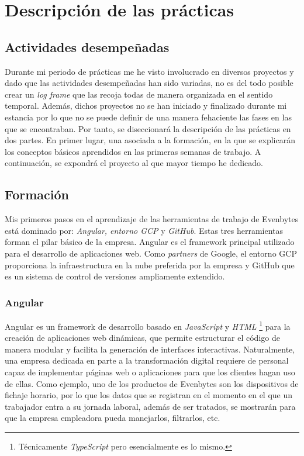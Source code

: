 \chapter{Descripción de las prácticas} \label{descripcion de las practicas}
%
%
\section{Actividades desempeñadas} \label{Actividades desempeñadas}
%
Durante mi periodo de prácticas me he visto involucrado en diversos proyectos y dado que las actividades desempeñadas han sido variadas, no es del todo posible crear un \textit{log frame} que las recoja todas de manera organizada en el sentido temporal. Además, dichos proyectos no se han iniciado y finalizado durante mi estancia por lo que no se puede definir de una manera fehaciente las fases en las que se encontraban. Por tanto, se diseccionará la descripción de las prácticas en dos partes. En primer lugar, una asociada a la formación, en la que se explicarán los conceptos básicos aprendidos en las primeras semanas de trabajo. A continuación, se expondrá el proyecto al que mayor tiempo he dedicado.
%
%
\section{Formación}
%
%
Mis primeros pasos en el aprendizaje de las herramientas de trabajo de Evenbytes está dominado por: \textit{Angular, entorno GCP} y \textit{GitHub}. Estas tres herramientas forman el pilar básico de la empresa. Angular es el framework principal utilizado para el desarrollo de aplicaciones web. Como \textit{partners} de Google, el entorno GCP proporciona la infraestructura en la nube preferida por la empresa y GitHub que es un sistema de control de versiones ampliamente extendido.
%
%
\subsection{Angular}
%
%
%
Angular es un framework de desarrollo basado en \textit{JavaScript} y \textit{HTML} \footnote{Técnicamente \textit{TypeScript} pero esencialmente es lo mismo.} para la creación de aplicaciones web dinámicas, que permite estructurar el código de manera modular y facilita la generación de interfaces interactivas. Naturalmente, una empresa dedicada en parte a la transformación digital requiere de personal capaz de implementar páginas web o aplicaciones para que los clientes hagan uso de ellas. Como ejemplo, uno de los productos de Evenbytes son los dispositivos de fichaje horario, por lo que los datos que se registran en el momento en el que un trabajador entra a su jornada laboral, además de ser tratados, se mostrarán para que la empresa empleadora pueda manejarlos, filtrarlos, etc.

